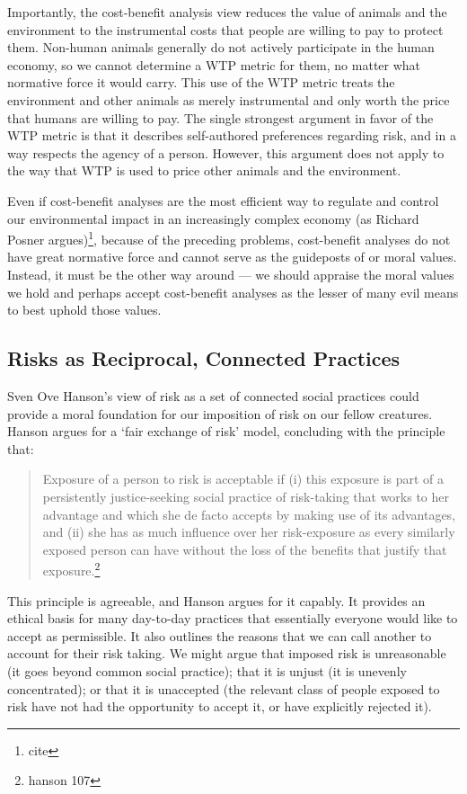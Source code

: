 Importantly, the cost-benefit analysis view reduces the value of animals and
the environment to the instrumental costs that people are willing to pay to
protect them. Non-human animals generally do not actively participate in the
human economy, so we cannot determine a WTP metric for them, no matter what
normative force it would carry. This use of the WTP metric treats the
environment and other animals as merely instrumental and only worth the price
that humans are willing to pay. The single strongest argument in favor of the
WTP metric is that it describes self-authored preferences regarding risk, and
in a way respects the agency of a person. However, this argument does not apply
to the way that WTP is used to price other animals and the environment.

Even if cost-benefit analyses are the most efficient way to regulate and
control our environmental impact in an increasingly complex economy (as Richard
Posner argues)\footnote{cite}, because of the preceding problems, cost-benefit
analyses do not have great normative force and cannot serve as the guideposts
of or moral values.  Instead, it must be the other way around --- we should
appraise the moral values we hold and perhaps accept cost-benefit analyses as
the lesser of many evil means to best uphold those values.

\subsection{Risks as Reciprocal, Connected Practices}

Sven Ove Hanson’s view of risk as a set of connected social practices could
provide a moral foundation for our imposition of risk on our fellow creatures.
Hanson argues for a ‘fair exchange of risk’ model, concluding with the principle
that:

\begin{quote}
  Exposure of a person to risk is acceptable if (i) this exposure is part of a
  persistently justice-seeking social practice of risk-taking that works to her
  advantage and which she de facto accepts by making use of its advantages, and
  (ii) she has as much influence over her risk-exposure as every similarly
  exposed person can have without the loss of the benefits that justify that
  exposure.\footnote{hanson 107}
\end{quote}

This principle is agreeable, and Hanson argues for it capably. It provides an
ethical basis for many day-to-day practices that essentially everyone would
like to accept as permissible.  It also outlines the reasons that  we can call
another to account for their risk taking.  We might argue that imposed risk is
unreasonable (it goes beyond common social practice); that it is unjust (it is
unevenly concentrated); or that it is unaccepted (the relevant class of people
exposed to risk have not had the opportunity to accept it, or have explicitly
rejected it).

